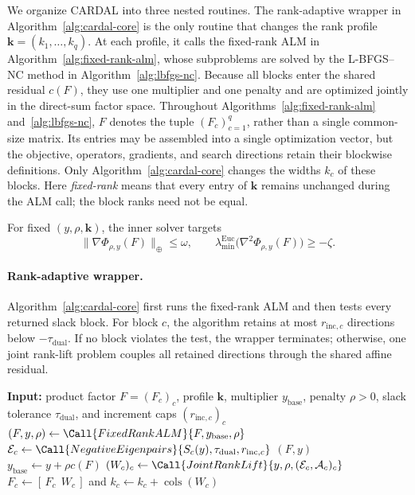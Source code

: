 \documentclass[11pt]{article}
\theoremstyle{definition}
\theoremstyle{remark}
\newcommand{\name}{\textsc{CARDAL}\xspace}
\begin{document}
We organize \name{} into three nested routines.  The rank-adaptive wrapper in
Algorithm~\ref{alg:cardal-core} is the only routine that changes the
rank profile $\mathbf k=(k_1,\ldots,k_q)$.  At each profile, it calls
the fixed-rank ALM in Algorithm~\ref{alg:fixed-rank-alm}, whose
subproblems are solved by the L-BFGS--NC method in
Algorithm~\ref{alg:lbfgs-nc}.  Because all blocks enter the shared residual
$c(F)$, they use one multiplier and one penalty and are optimized jointly in
the direct-sum factor space.  Throughout Algorithms~\ref{alg:fixed-rank-alm}
and~\ref{alg:lbfgs-nc}, $F$ denotes the tuple $(F_c)_{c=1}^q$, rather than a
single common-size matrix.  Its entries may be assembled into a single
optimization vector, but the objective, operators, gradients,
and search directions retain their blockwise definitions.  Only
Algorithm~\ref{alg:cardal-core} changes the widths $k_c$ of these blocks.
Here \emph{fixed-rank} means that every entry of $\mathbf k$ remains unchanged
during the ALM call; the block ranks need not be equal.

For fixed $(y,\rho,\mathbf k)$, the inner solver targets
\begin{equation}
  \|\nabla\Phi_{\rho,y}(F)\|_\oplus\leq\omega,
  \qquad
  \lambda_{\min}^{\mathrm{Euc}}
  \bigl(\nabla^2\Phi_{\rho,y}(F)\bigr)\geq-\zeta.
  \label{eq:inner-sosp-contract}
\end{equation}

\paragraph{Rank-adaptive wrapper.}
Algorithm~\ref{alg:cardal-core} first runs the fixed-rank ALM and then
tests every returned slack block.  For block $c$, the algorithm retains at most
$r_{\mathrm{inc},c}$ directions below $-\tau_{\mathrm{dual}}$.  If no block
violates the test, the wrapper terminates; otherwise, one joint rank-lift
problem couples all retained directions through the shared affine residual.

\begin{algorithm}[H]
\caption{\name{} rank-adaptive wrapper}
\label{alg:cardal-core}
\begin{algorithmic}[1]
\State \textbf{Input:} product factor $F=(F_c)_c$, profile $\mathbf k$,
multiplier $y_{\mathrm{base}}$, penalty $\rho>0$, slack tolerance
$\tau_{\mathrm{dual}}$, and increment caps $(r_{\mathrm{inc},c})_c$
\Loop
  \State $(F,y,\rho)\gets
    \Call{FixedRankALM}{F,y_{\mathrm{base}},\rho}$
    \State $\mathcal E_c\gets
      \Call{NegativeEigenpairs}
      {S_c(y),\tau_{\mathrm{dual}},r_{\mathrm{inc},c}}$
  \EndFor
    \State \Return $(F,y)$
  \Else
    \State $y_{\mathrm{base}}\gets y + \rho c(F)$
    \State $(W_c)_c\gets
      \Call{JointRankLift}{y,\rho,(\mathcal E_c,\mathcal A_c)_c}$
      \State $F_c\gets[\,F_c\ \ W_c\,]$ and
      $k_c\gets k_c+\operatorname{cols}(W_c)$
    \EndFor
  \EndIf
\EndLoop
\end{algorithmic}
\end{algorithm}
\end{document}
